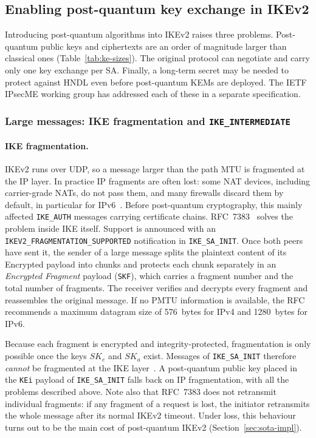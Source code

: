 \subsection{Enabling post-quantum key exchange in IKEv2}
\label{sec:sota-pqc-ike}

Introducing post-quantum algorithms into IKEv2 raises three problems. Post-quantum
public keys and ciphertexts are an order of magnitude larger than classical ones
(Table~\ref{tab:ke-sizes}). The original protocol can negotiate and carry only
one key exchange per SA. Finally, a long-term secret may be needed to protect
against HNDL even before post-quantum KEMs are deployed. The IETF IPsecME
working group has addressed each of these in a separate specification.

\subsubsection{Large messages: IKE fragmentation and \texttt{IKE\_INTERMEDIATE}}
\label{sec:sota-frag}

\paragraph{IKE fragmentation.}
IKEv2 runs over UDP, so a message larger than the path MTU is fragmented at
the IP layer. In practice IP fragments are often lost: some NAT devices,
including carrier-grade NATs, do not pass them, and many firewalls discard
them by default, in particular for IPv6~\cite{rfc7383}. Before post-quantum
cryptography, this mainly affected \texttt{IKE\_AUTH} messages carrying
certificate chains. RFC~7383~\cite{rfc7383} solves the problem inside IKE
itself. Support is announced with an \texttt{IKEV2\_FRAGMENTATION\_SUPPORTED}
notification in \texttt{IKE\_SA\_INIT}. Once both peers have sent it, the
sender of a large message splits the plaintext content of its Encrypted
payload into chunks and protects each chunk separately in an \emph{Encrypted
Fragment} payload (\texttt{SKF}), which carries a fragment number and the
total number of fragments. The receiver verifies and decrypts every fragment
and reassembles the original message. If no PMTU information is available, the
RFC recommends a maximum datagram size of 576~bytes for IPv4 and 1280~bytes
for IPv6.

Because each fragment is encrypted and integrity-protected, fragmentation is
only possible once the keys $SK_e$ and $SK_a$ exist. Messages of
\texttt{IKE\_SA\_INIT} therefore \emph{cannot} be fragmented at the IKE
layer~\cite{rfc7383}. A post-quantum public key placed in the \texttt{KEi}
payload of \texttt{IKE\_SA\_INIT} falls back on IP fragmentation, with all the
problems described above. Note also that RFC~7383 does not retransmit
individual fragments: if any fragment of a request is lost, the initiator
retransmits the whole message after its normal IKEv2 timeout. Under loss,
this behaviour turns out to be the main cost of post-quantum IKEv2
(Section~\ref{sec:sota-impl}).

